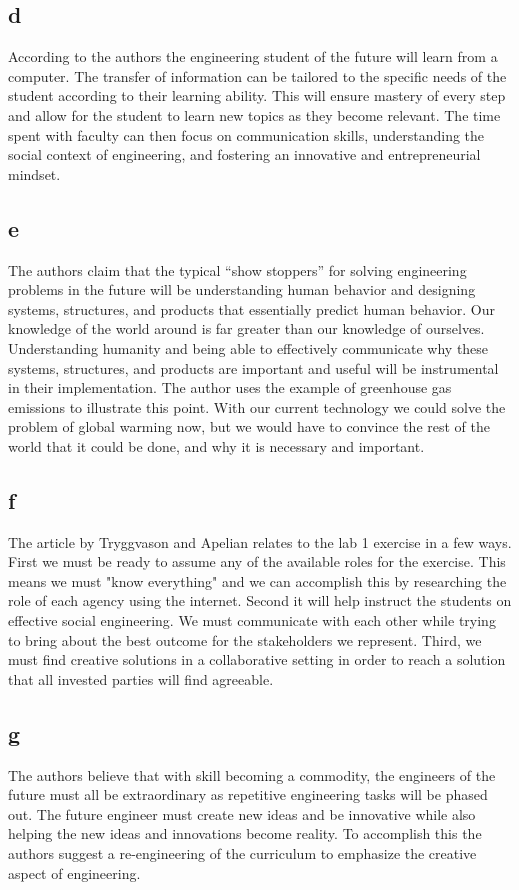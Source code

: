 \documentclass[12pt]{article} %
\begin{document}
	\subsection{d}
		According to the authors the engineering student of the future will learn from a computer. The transfer of information can be tailored to the specific needs of the student according to their learning ability. This will ensure mastery of every step and allow for the student to learn new topics as they become relevant. The time spent with faculty can then focus on communication skills, understanding the social context of engineering, and fostering an innovative and entrepreneurial mindset.

	\subsection{e}
		The authors claim that the typical “show stoppers” for solving engineering problems in the future will be understanding human behavior and designing systems, structures, and products that essentially predict human behavior. Our knowledge of the world around is far greater than our knowledge of ourselves. Understanding humanity and being able to effectively communicate why these systems, structures, and products are important and useful will be instrumental in their implementation. The author uses the example of greenhouse gas emissions to illustrate this point. With our current technology we could solve the problem of global warming now, but we would have to convince the rest of the world that it could be done, and why it is necessary and important.

	\subsection{f}
		The article by Tryggvason and Apelian relates to the lab 1 exercise in a few ways. First we must be ready to assume any of the available roles for the exercise. This means we must "know everything" and we can accomplish this by researching the role of each agency using the internet. Second it will help instruct the students on effective social engineering. We must communicate with each other while trying to bring about the best outcome for the stakeholders we represent. Third, we must find creative solutions in a collaborative setting in order to reach a solution that all invested parties will find agreeable.

	\subsection{g}
		The authors believe that with skill becoming a commodity, the engineers of the future must all be extraordinary as repetitive engineering tasks will be phased out. The future engineer must create new ideas and be innovative while also helping the new ideas and innovations become reality. To accomplish this the authors suggest a re-engineering of the curriculum to emphasize the creative aspect of engineering.
\end{document}
